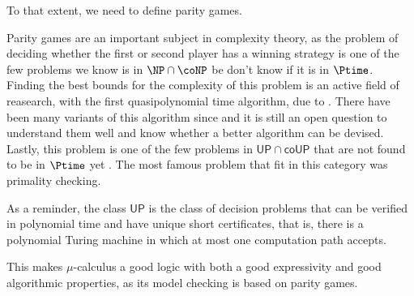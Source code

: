 

To that extent, we need to define parity games.

Parity games are an important subject in complexity theory,
as the problem of deciding whether the first or second player
has a winning strategy is one of the few problems we know is
in $\NP \cap \coNP$ be don't know if it is in $\Ptime$.
Finding the best bounds for the complexity of this problem is
an active field of reasearch, with the first
quasipolynomial time algorithm, due to \cite{calude2017deciding}.
There have been many variants of this algorithm since and it is still
an open question to understand them well and know whether a better algorithm
can be devised.
Lastly, this problem is one of the few problems in $\mathsf{UP} \cap \mathsf{coUP}$
that are not found to be in $\Ptime$ yet \cite{jurdzinski1998deciding}.
The most famous problem that fit in this category was primality checking.

As a reminder, the class $\mathsf{UP}$ is the class of decision problems
that can be verified in polynomial time and have unique short certificates,
that is, there is a polynomial Turing machine in which at most one computation path accepts.

This makes $\mu$-calculus a good logic with both a good expressivity and
good algorithmic properties, as its model checking is based on parity games.

